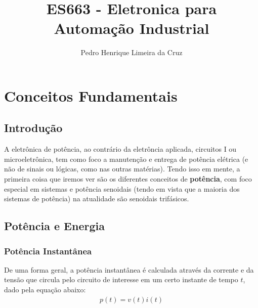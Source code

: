 \documentclass{article}
\author{Pedro Henrique Limeira da Cruz}
\title{ES663 - Eletronica para Automação Industrial}
\begin{document}
    
    \maketitle
    \thispagestyle{empty}
    
    
    \newpage
    \tableofcontents
    \newpage

    \section{Conceitos Fundamentais}
        \subsection{Introdução}
            A eletrônica de potência, ao contrário da eletrôncia aplicada, circuitos I ou microeletrônica, tem como foco a manutenção e entrega de potência elétrica (e não de sinais ou lógicas, como nas outras matérias). 
            Tendo isso em mente, a primeira coisa que iremos ver são os diferentes conceitos de \textbf{potência}, com foco especial em sistemas e potência senoidais (tendo em vista que a maioria dos sistemas de potência)
            na atualidade são senoidais trifásicos.

        \subsection{Potência e Energia}
            \subsubsection*{Potência Instantânea}
                De uma forma geral, a potência instantânea é calculada através da corrente e da tensão que circula pelo circuito de interesse em um certo instante de tempo $t$, dado pela equação abaixo:
                \begin{align}
                    p(t) = v(t)i(t)
                \end{align}
\end{document}
